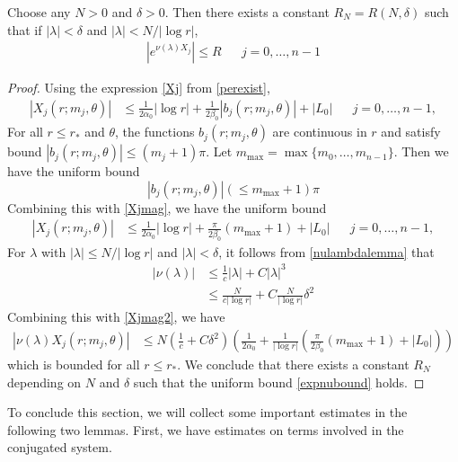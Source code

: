 \documentclass[thesis.tex]{subfiles}
\begin{document}
\begin{lemma}\label{lemma:expnubound}
Choose any $N > 0$ and $\delta > 0$. Then there exists a constant $R_N = R(N, \delta)$ such that if $|\lambda| < \delta$ and $|\lambda| < N/|\log r|$,
\begin{align}\label{expnubound}
\left|e^{\nu(\lambda)X_j} \right| \leq R && j = 0, \dots, n-1
\end{align}
\begin{proof}
Using the expression \cref{Xj} from \cref{perexist},
\begin{align}\label{Xjmag}
|X_j(r; m_j, \theta)| &\leq \frac{1}{2 \alpha_0} |\log r| + \frac{1}{2\beta_0} |b_j(r; m_j, \theta)| + |L_0| && j = 0, \dots, n-1,
\end{align}
For all $r \leq r_*$ and $\theta$, the functions $b_j(r; m_j, \theta)$ are continuous in $r$ and satisfy bound $|b_j(r; m_j, \theta)| \leq (m_j + 1)\pi$. Let $m_{\max} = \max\{ m_0, \dots, m_{n-1}\}$. Then we have the uniform bound
\[
|b_j(r; m_j, \theta)| (\leq m_{\max} + 1)\pi
\]
Combining this with \cref{Xjmag}, we have the uniform bound
\begin{align}\label{Xjmag2}
\left|X_j(r; m_j, \theta)\right| &\leq \frac{1}{2 \alpha_0} |\log r| + \frac{\pi}{2\beta_0} (m_{\max} + 1) + |L_0| && j = 0, \dots, n-1,
\end{align}
For $\lambda$ with $|\lambda| \leq N/|\log r|$ and $|\lambda| < \delta$, it follows from \cref{nulambdalemma} that
\begin{align*}
|\nu(\lambda)| &\leq \frac{1}{c}|\lambda| + C |\lambda|^3 \\
&\leq \frac{N}{c |\log r|} + C \frac{N}{|\log r|}\delta^2
\end{align*}
Combining this with \cref{Xjmag2}, we have
\begin{align*}
|\nu(\lambda) X_j(r; m_j, \theta)| &\leq  N \left( \frac{1}{c} + C \delta^2 \right)\left( \frac{1}{2 \alpha_0} + \frac{1}{|\log r|} \left( \frac{\pi}{2\beta_0} (m_{\max} + 1) + |L_0| \right) \right)
\end{align*}
which is bounded for all $r \leq r_*$. We conclude that there exists a constant $R_N$ depending on $N$ and $\delta$ such that the uniform bound \cref{expnubound} holds.
\end{proof}
\end{lemma}

To conclude this section, we will collect some important estimates in the following two lemmas. First, we have estimates on terms involved in the conjugated system.
\end{document}
